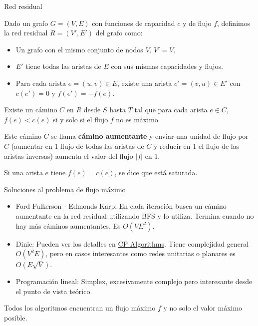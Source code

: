 \documentclass{beamer}
\begin{document}
\begin{frame}{Red residual}
    \begin{definition}
        Dado un grafo $G = (V,E)$ con funciones de capacidad $c$ y de flujo $f$, definimos la red residual $R = (V',E')$ del grafo como:
        \begin{itemize}
            \item Un grafo con el mismo conjunto de nodos $V$. $V' = V$.
            \item $E'$ tiene todas las aristas de $E$ con sus mismas capacidades y flujos.
            \item Para cada arista $e = (u,v) \in E$, existe una arista $e' = (v,u) \in E'$ con $c(e') = 0$ y $f(e') = -f(e)$.
        \end{itemize}
    \end{definition}

    \pause 

    \begin{Theorem}
        Existe un cámino $C$ en $R$ desde $S$ hasta $T$ tal que para cada arista $e \in C$, $f(e)<c(e)$ si y solo si el flujo $f$ no es máximo.

        Este cámino $C$ se llama \textbf{cámino aumentante} y enviar una unidad de flujo por $C$ (aumentar en 1 flujo de todas las aristas de $C$ y reducir en 1 el flujo de las aristas inversas) aumenta el valor del flujo $|f|$ en 1.
    \end{Theorem}

    Si una arista $e$ tiene $f(e) = c(e)$, se dice que está saturada.
\end{frame}

\begin{frame}{Soluciones al problema de flujo máximo}
    \begin{itemize}
        \item Ford Fulkerson - Edmonds Karp: En cada iteración busca un cámino aumentante en la red residual utilizando BFS y lo utiliza. Termina cuando no hay más cáminos aumentantes. Es $O(VE^2)$.
        \item Dinic: Pueden ver los detalles en \href{https://cp-algorithms.com/graph/dinic.html}{CP Algorithms}. Tiene complejidad general $O(V^2E)$, pero en casos interesantes como redes unitarias o planares es $O(E\sqrt{V})$.
        \item Programación lineal: Simplex, excesivamente complejo pero interesante desde el punto de vista teórico.
    \end{itemize}

    Todos los algoritmos encuentran un flujo máximo $f$ y no solo el valor máximo posible.
\end{frame}
\end{document}
